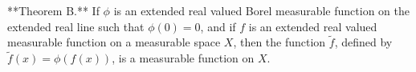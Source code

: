 **Theorem B.** If $\phi$ is an extended real valued Borel measurable function on the extended real line such that $\phi(0) = 0$, and if $f$ is an extended real valued measurable function on a measurable space $X$, then the function $\tilde{f}$, defined by $\tilde{f}(x) = \phi(f(x))$, is a measurable function on $X$.

